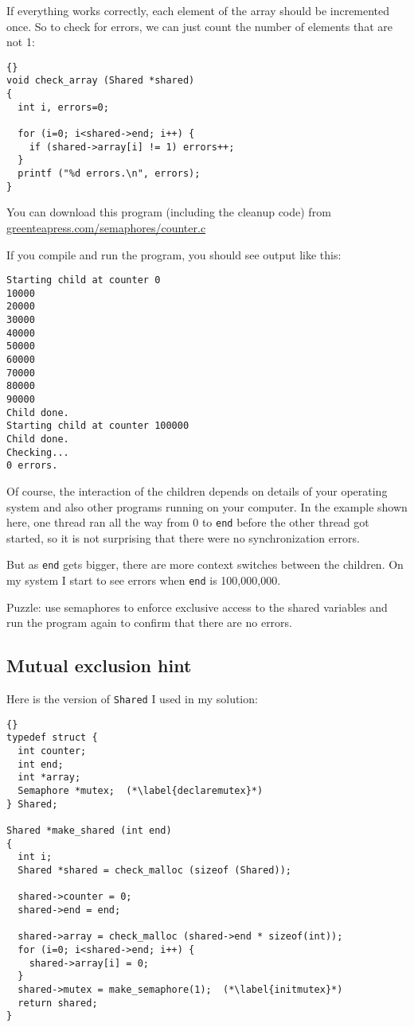 \documentclass{book}
\newcommand{\clearemptydoublepage}{\newpage\cleardoublepage}
\begin{document}
If everything works correctly, each element of the array should be
incremented once.  So to check for errors, we can just count the
number of elements that are not 1:

\begin{lstlisting}[title={}]{}
void check_array (Shared *shared)
{
  int i, errors=0;

  for (i=0; i<shared->end; i++) {
    if (shared->array[i] != 1) errors++;
  }
  printf ("%d errors.\n", errors);
}
\end{lstlisting}

You can download this program (including the cleanup code) from
\url{greenteapress.com/semaphores/counter.c}

If you compile and run the program, you should see output like this:

\begin{verbatim}
Starting child at counter 0
10000
20000
30000
40000
50000
60000
70000
80000
90000
Child done.
Starting child at counter 100000
Child done.
Checking...
0 errors.
\end{verbatim}

Of course, the interaction of the children depends on details
of your operating system and also other programs running on your
computer.  In the example shown here, one thread ran all the way
from 0 to {\tt end} before the other thread got started, so it is
not surprising that there were no synchronization errors.

But as {\tt end} gets bigger, there are more context switches between
the children.  On my system I start to see errors when
{\tt end} is 100,000,000.

Puzzle: use semaphores to enforce exclusive access to the shared
variables and run the program again to confirm that there are
no errors.

\clearemptydoublepage
\subsection{Mutual exclusion hint}

Here is the version of {\tt Shared} I used in my solution:

\begin{lstlisting}[title={}]{}
typedef struct {
  int counter;
  int end;
  int *array;
  Semaphore *mutex;  (*\label{declaremutex}*)
} Shared;

Shared *make_shared (int end)
{
  int i;
  Shared *shared = check_malloc (sizeof (Shared));

  shared->counter = 0;
  shared->end = end;

  shared->array = check_malloc (shared->end * sizeof(int));
  for (i=0; i<shared->end; i++) {
    shared->array[i] = 0;
  }
  shared->mutex = make_semaphore(1);  (*\label{initmutex}*)
  return shared;
}
\end{lstlisting}
\end{document}
